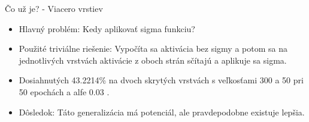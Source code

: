 \documentclass[xcolor=dvipsnames]{beamer}
\begin{document}


\begin{frame}{Čo už je? - Viacero vrstiev}
\begin{itemize}
  \item Hlavný problém: Kedy aplikovať sigma funkciu?
  \item Použité triviálne riešenie: Vypočíta sa aktivácia bez sigmy a potom sa na jednotlivých vrstvách aktivácie z oboch strán sčítajú a aplikuje sa sigma. 
  \item Dosiahnutých 43.2214\% na dvoch skrytých vrstvách s veľkosťami 300 a 50 pri 50 epochách a alfe 0.03 . 
  \item Dôsledok: Táto generalizácia má potenciál, ale pravdepodobne existuje lepšia. 
\end{itemize} 

\end{frame}
\end{document}
